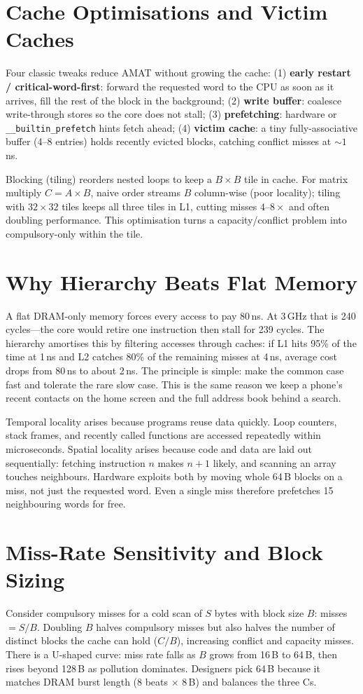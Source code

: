 \section{Cache Optimisations and Victim Caches}
Four classic tweaks reduce AMAT without growing the cache: (1) \textbf{early restart / critical-word-first}: forward the requested word to the CPU as soon as it arrives, fill the rest of the block in the background; (2) \textbf{write buffer}: coalesce write-through stores so the core does not stall; (3) \textbf{prefetching}: hardware or \texttt{\_\_builtin\_prefetch} hints fetch ahead; (4) \textbf{victim cache}: a tiny fully-associative buffer (4--8 entries) holds recently evicted blocks, catching conflict misses at $\sim 1$\,ns.

Blocking (tiling) reorders nested loops to keep a $B\times B$ tile in cache. For matrix multiply $C=A\times B$, naive order streams $B$ column-wise (poor locality); tiling with $32\times32$ tiles keeps all three tiles in L1, cutting misses $4$--$8\times$ and often doubling performance. This optimisation turns a capacity/conflict problem into compulsory-only within the tile.
\section{Why Hierarchy Beats Flat Memory}
A flat DRAM-only memory forces every access to pay 80\,ns. At 3\,GHz that is 240 cycles---the core would retire one instruction then stall for 239 cycles. The hierarchy amortises this by filtering accesses through caches: if L1 hits 95\% of the time at 1\,ns and L2 catches 80\% of the remaining misses at 4\,ns, average cost drops from 80\,ns to about 2\,ns. The principle is simple: make the common case fast and tolerate the rare slow case. This is the same reason we keep a phone's recent contacts on the home screen and the full address book behind a search.

Temporal locality arises because programs reuse data quickly. Loop counters, stack frames, and recently called functions are accessed repeatedly within microseconds. Spatial locality arises because code and data are laid out sequentially: fetching instruction $n$ makes $n+1$ likely, and scanning an array touches neighbours. Hardware exploits both by moving whole 64\,B blocks on a miss, not just the requested word. Even a single miss therefore prefetches 15 neighbouring words for free.

\section{Miss-Rate Sensitivity and Block Sizing}
Consider compulsory misses for a cold scan of $S$ bytes with block size $B$: misses $=S/B$. Doubling $B$ halves compulsory misses but also halves the number of distinct blocks the cache can hold ($C/B$), increasing conflict and capacity misses. There is a U-shaped curve: miss rate falls as $B$ grows from 16\,B to 64\,B, then rises beyond 128\,B as pollution dominates. Designers pick 64\,B because it matches DRAM burst length (8 beats $\times$ 8\,B) and balances the three Cs.

